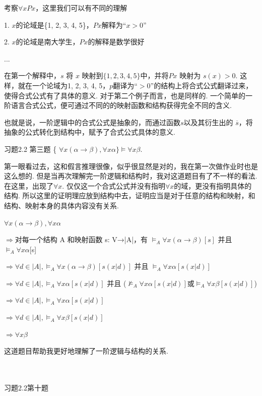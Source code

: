 考察$ {\forall}xPx$，这里我们可以有不同的理解

1. $x$的论域是\{1, 2, 3, 4, 5\}，$Px$解释为$“x > 0”$

2. $x$的论域是南大学生，$Px$的解释是数学很好

   ...

在第一个解释中，$s$ 将 $x$ 映射到$\{1, 2, 3, 4, 5\}$中，并将$Px$ 映射为 $s(x) > 0$. 这样，就在一个论域为{1, 2, 3, 4, 5}，$p$翻译为$“ > 0”$的结构上将合式公式翻译过来，使得合式公式有了具体的意义. 对于第二个例子而言，也是同样的. 一个简单的一阶语言合式公式，便可通过不同的的映射函数和结构获得完全不同的含义.

也就是说，一阶逻辑中的合式公式是抽象的，而通过函数$ s $以及其衍生出的 $\overline{s}$，将抽象的公式转化到结构中，赋予了合式公式具体的意义.

习题2.2 第三题 \{ $\forall x(\alpha \rightarrow \beta), \forall x\alpha \}\models \forall x\beta$.

第一眼看过去，这和假言推理很像，似乎很显然是对的，我在第一次做作业时也是这么想的. 但是当再次理解完一阶逻辑和结构时，我对这道题目有了不一样的看法. 在这里，出现了$\forall x$. 仅仅这一个合式公式并没有指明$\forall x$的域，更没有指明具体的结构. 所以这里的证明理应放到结构中去，证明应当是对于任意的结构和映射，和结构、映射本身的具体内容没有关系.

$\forall x(\alpha \rightarrow \beta), \forall x\alpha $

$\Rightarrow$对每一个结构 A 和映射函数 s: V→|A|，有 $\models_{A} \forall x(\alpha \rightarrow \beta)[s]$ 并且 $\models_{A} \forall x\alpha $[s]

$ \Rightarrow \forall d \in |A|,  \models_{A} \forall x(\alpha \rightarrow \beta)[s(x|d)]$ 并且 $\models_{A} \forall x\alpha [s(x|d)]$

$ \Rightarrow \forall d \in |A|, \models_{A} \forall x\alpha [s(x|d)]$ 并且 ($ \nvDash_{A} \forall x\alpha [s(x|d)]$或$\models_{A} \forall x\beta [s(x|d)]$)

$ \Rightarrow \forall d \in |A|, \models_{A} \forall x\alpha [s(x|d)]$ 

$ \Rightarrow \forall d \in |A|,\models_{A} \forall x\beta [s(x|d)]$

$ \Rightarrow \forall x\beta$

这道题目帮助我更好地理解了一阶逻辑与结构的关系.

\\ \hspace*{\fill} \\

习题2.2第十题

